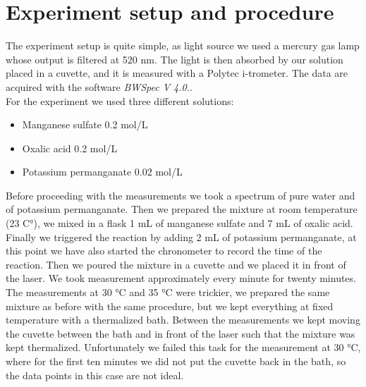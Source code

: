 \documentclass[a4paper,10pt]{article}
\begin{document}
\section{Experiment setup and procedure}
The experiment setup is quite simple, as light source we used a mercury gas lamp whose output is filtered at 520 nm. The light is then absorbed by our solution placed in a cuvette, and it is measured with a Polytec i-trometer. The data are acquired with the software \emph{BWSpec V 4.0.}.\\
For the experiment we used three different solutions:
\begin{itemize}
	\item Manganese sulfate  0.2 mol/L
	\item Oxalic acid  0.2 mol/L
	\item Potassium permanganate  0.02 mol/L
\end{itemize} 
Before proceeding with the measurements we took a spectrum of pure water and of potassium permanganate. Then we prepared the mixture at room temperature (23 C°), we mixed in a flask 1 mL of manganese sulfate and 7 mL of oxalic acid. Finally we triggered the reaction by adding 2 mL of potassium permanganate, at this point we have also started the chronometer to record the time of the reaction. Then we poured the mixture in a cuvette and we placed it in front of the laser. We took measurement approximately every minute for twenty minutes. \\
The measurements at 30 °C and 35 °C were trickier, we prepared the same mixture as before with the same procedure, but we kept everything at fixed temperature with a thermalized bath. Between the measurements we kept moving the cuvette between the bath and in front of the laser such that the mixture was kept thermalized. Unfortunately we failed this task for the measurement at 30 °C, where for the first ten minutes we did not put the cuvette back in the bath, so the data points in this case are not ideal.
\end{document}
